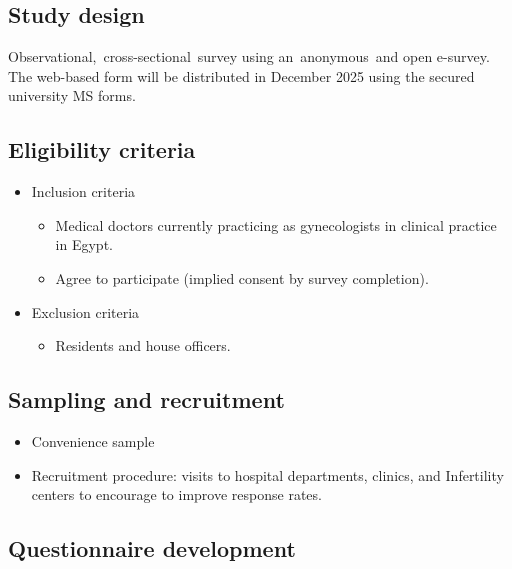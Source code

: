 \documentclass[
  letterpaper,
  DIV=11,
  numbers=noendperiod]{scrartcl}
\providecommand{\tightlist}{%
  \setlength{\itemsep}{0pt}\setlength{\parskip}{0pt}}
\begin{document}
\subsection{Study design}\label{study-design}

Observational,~cross-sectional~survey using an~anonymous~and open
e-survey. The web-based form will be distributed in December 2025 using
the secured university MS forms.

\subsection{Eligibility criteria}\label{eligibility-criteria}

\begin{itemize}
\item
  Inclusion criteria

  \begin{itemize}
  \item
    Medical doctors currently practicing as gynecologists in clinical
    practice in Egypt.
  \item
    Agree to participate (implied consent by survey completion).
  \end{itemize}
\item
  Exclusion criteria

  \begin{itemize}
  \tightlist
  \item
    Residents and house officers.
  \end{itemize}
\end{itemize}

\subsection{Sampling and recruitment}\label{sampling-and-recruitment}

\begin{itemize}
\item
  Convenience sample
\item
  Recruitment procedure: visits to hospital departments, clinics, and
  Infertility centers to encourage to improve response rates.
\end{itemize}

\subsection{Questionnaire development}\label{questionnaire-development}
\end{document}
